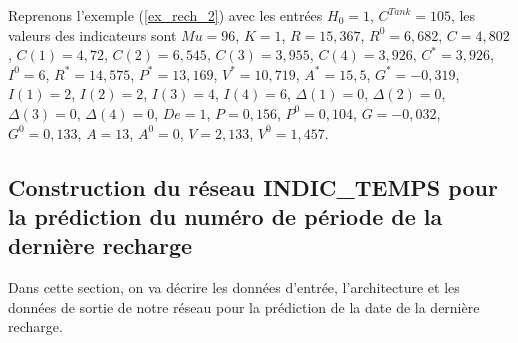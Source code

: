 \begin{Example}
	Reprenons l'exemple (\ref{ex_rech_2}) avec les entrées $H_0=1$, $C^{Tank}=105$,  les valeurs des indicateurs sont $Mu =96$, $K =1 $, $R=15,367$, $R^0=6,682$, $C=4,802$, $C(1)=4,72$, $C(2)=6,545$, $C(3)=3,955$, $C(4)=3,926$, $C^*=3,926$, $I^0 =6 $, $R^* =14,575$, $P^* =13,169$, $V^* =10,719$, $A^* =15,5$, $G^* =-0,319$, $I(1) =2$, $I(2) =2$, $I(3) =4$, $I(4) =6$, $\Delta(1)=0$, $\Delta(2)=0$, $\Delta(3)=0$, $\Delta(4)=0$, $De=1$, $P=0,156$, $P^0=0,104$, $G=-0,032$, $G^0=0,133$, $A=13$, $A^0=0$, $V=2,133$, $V^0=1,457$.
\end{Example}

\subsection{Construction du réseau \textbf{INDIC\_TEMPS} pour la prédiction du numéro de période de la dernière recharge}
Dans cette section, on va décrire les données d'entrée, l'architecture et les données de sortie de notre réseau pour la prédiction de la date de la dernière recharge.
